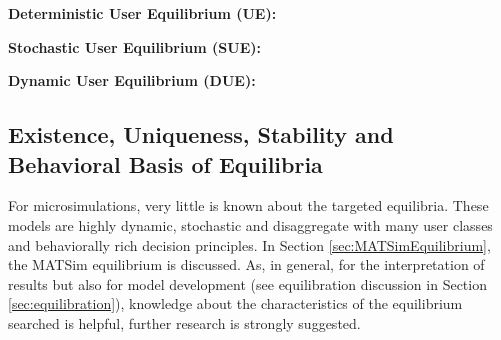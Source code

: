\textbf{Deterministic User Equilibrium (UE):}

\textbf{Stochastic User Equilibrium (SUE):}
 
\textbf{Dynamic User Equilibrium (DUE):}

\subsection{Existence, Uniqueness, Stability and Behavioral Basis of Equilibria}
For microsimulations, very little is known about the targeted equilibria. These models are highly dynamic, stochastic and disaggregate with many user classes and behaviorally rich decision principles. In Section \ref{sec:MATSimEquilibrium}, the MATSim equilibrium is discussed. As, in general, for the interpretation of results but also for model development (see equilibration discussion in Section \ref{sec:equilibration}), knowledge about the characteristics of the equilibrium searched is helpful, further research is strongly suggested.


